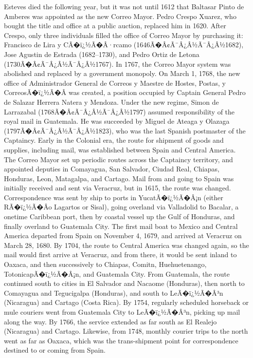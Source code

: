 Esteves died the following year, but it was not until 1612 that Baltasar Pinto de Amberes was appointed as the new Correo Mayor. Pedro Crespo Xuarez, who bought the title and office at a public auction, replaced him in 1620. After Crespo, only three individuals filled the office of Correo Mayor by purchasing it: Francisco de Lira y CÃ�ï¿½Ã�Â·rcamo (1646Ã�Â¢Ã¯Â¿Â½Ã¯Â¿Â½1682), Jose Agustin de Estrada (1682--1730), and Pedro Ortiz de Letona (1730Ã�Â¢Ã¯Â¿Â½Ã¯Â¿Â½1767). In 1767, the Correo Mayor system was abolished and replaced by a government monopoly. On March 1, 1768, the new office of Administrador General de Correos y Maestre de Hostes, Postas, y CorreosÃ�ï¿½Ã�Â­ was created, a position occupied by Captain General Pedro de Salazar Herrera Natera y Mendoza. Under the new regime, Simon de Larrazabal (1768Ã�Â¢Ã¯Â¿Â½Ã¯Â¿Â½1797) assumed responsibility of the royal mail in Guatemala. He was succeeded by Miguel de Ateaga y Olazaga (1797Ã�Â¢Ã¯Â¿Â½Ã¯Â¿Â½1823), who was the last Spanish postmaster of the Captaincy.
Early in the Colonial era, the route for shipment of goods and supplies, including mail, was established between Spain and Central America. The Correo Mayor set up periodic routes across the Captaincy territory, and appointed deputies in Comayagua, San Salvador, Ciudad Real, Chiapas, Honduras, Leon, Matagalpa, and Cartago. Mail from and going to Spain was initially received and sent via Veracruz, but in 1615, the route was changed. Correspondence was sent by ship to ports in YucatÃ�ï¿½Ã�Â¡n (either RÃ�ï¿½Ã�Â­o Lagartos or Sisal), going overland via Valladolid to Bacalar, a onetime Caribbean port, then by coastal vessel up the Gulf of Honduras, and finally overland to Guatemala City.
The first mail boat to Mexico and Central America departed from Spain on November 4, 1679, and arrived at Veracruz on March 28, 1680. By 1704, the route to Central America was changed again, so the mail would first arrive at Veracruz, and from there, it would be sent inland to Oaxaca, and then successively to Chiapas, Comitn, Huehuetenango, TotonicapÃ�ï¿½Ã�Â¡n, and Guatemala City. From Guatemala, the route continued south to cities in El Salvador and Nacaome (Honduras), then north to Comayagua and Tegucigalpa (Honduras), and south to LeÃ�ï¿½Ã�Â³n (Nicaragua) and Cartago (Costa Rica).
By 1754, regularly scheduled horseback or mule couriers went from Guatemala City to LeÃ�ï¿½Ã�Â³n, picking up mail along the way. By 1766, the service extended as far south as El Realejo (Nicaragua) and Cartago. Likewise, from 1748, monthly courier trips to the north went as far as Oaxaca, which was the trans-shipment point for correspondence destined to or coming from Spain.

